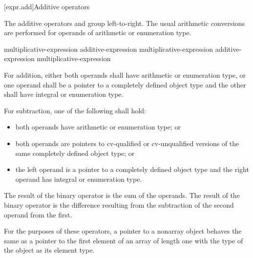 [expr.add]{Additive operators}%
%

\pnum
The additive operators \tcode{+} and \tcode{-} group left-to-right. The
usual arithmetic conversions are performed for operands of arithmetic or
enumeration type.

%
%
%
%
%
\begin{bnf}
\br
    multiplicative-expression\br
    additive-expression \terminal{+} multiplicative-expression\br
    additive-expression \terminal{-} multiplicative-expression
\end{bnf}

%
For addition, either both operands shall have arithmetic or enumeration
type, or one operand shall be a pointer to a completely defined object
type and the other shall have integral or enumeration type.

\pnum
For subtraction, one of the following shall hold:

\begin{itemize}
\item both operands have arithmetic or enumeration type; or

%
\item both operands are pointers to cv-qualified or cv-unqualified
versions of the same completely defined object type; or

\item the left operand is a pointer to a completely defined object type
and the right operand has integral or enumeration type.
\end{itemize}

\pnum
The result of the binary \tcode{+} operator is the sum of the operands.
The result of the binary \tcode{-} operator is the difference resulting
from the subtraction of the second operand from the first.

\pnum
{}%
For the purposes of these operators, a pointer to a nonarray object
behaves the same as a pointer to the first element of an array of length
one with the type of the object as its element type.

